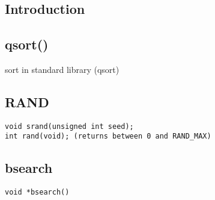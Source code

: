 
\subsection{Introduction}

\subsection{qsort()}
sort in standard library (qsort)

\subsection{RAND}

\begin{verbatim}
void srand(unsigned int seed);
int rand(void); (returns between 0 and RAND_MAX)
\end{verbatim}


\subsection{bsearch}

\begin{verbatim}
void *bsearch()
\end{verbatim}
